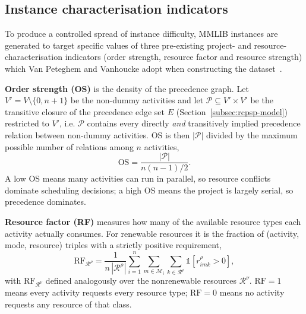 
\subsection{Instance characterisation indicators}
\label{subsec:indicators}

To produce a controlled spread of instance difficulty, MMLIB instances are
generated to target specific values of three pre-existing project- and
resource-characterisation indicators (order strength, resource factor and
resource strength) which Van Peteghem and Vanhoucke adopt when
constructing the dataset~\cite{vanpeteghem2014}.

\textbf{Order strength (OS)} is the density of the precedence graph. Let
$V' = V \setminus \{0, n+1\}$ be the non-dummy activities and let $\mathcal{P}
\subseteq V' \times V'$ be the transitive closure of the precedence edge set
$E$ (Section~\ref{subsec:rcpsp-model}) restricted to $V'$, i.e. $\mathcal{P}$
contains every directly \emph{and} transitively implied precedence relation
between non-dummy activities. OS is then $|\mathcal{P}|$ divided by the
maximum possible number of relations among $n$ activities,
\[
  \mathrm{OS} = \frac{|\mathcal{P}|}{n(n-1)/2}.
\]
A low OS means many activities can run in parallel, so resource conflicts
dominate scheduling decisions; a high OS means the project is largely
serial, so precedence dominates.

\textbf{Resource factor (RF)} measures how many of the available resource
types each activity actually consumes. For renewable resources it is the
fraction of (activity, mode, resource) triples with a strictly positive
requirement,
\[
  \mathrm{RF}_{\mathcal{R}^{\rho}} =
  \frac{1}{n\,|\mathcal{R}^{\rho}|}
  \sum_{i=1}^{n} \sum_{m \in \mathcal{M}_i} \sum_{k \in \mathcal{R}^{\rho}}
  \mathds{1}\!\left[r^{\rho}_{imk} > 0\right],
\]
with $\mathrm{RF}_{\mathcal{R}^{\nu}}$ defined analogously over the nonrenewable
resources $\mathcal{R}^{\nu}$. $\mathrm{RF}=1$ means every activity requests
every resource type; $\mathrm{RF}=0$ means no activity requests any resource
of that class.

